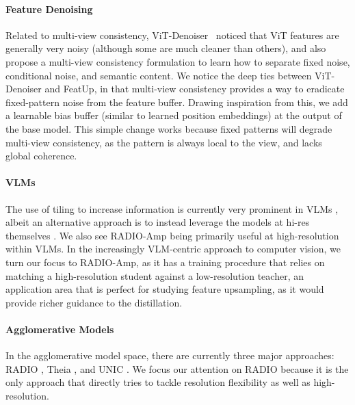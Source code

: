 \paragraph{Feature Denoising}
Related to multi-view consistency, ViT-Denoiser~\cite{yang2024denoising} noticed that ViT features are generally very noisy (although some are much cleaner than others), and also propose a multi-view consistency formulation to learn how to separate fixed noise, conditional noise, and semantic content. We notice the deep ties between ViT-Denoiser and FeatUp, in that multi-view consistency provides a way to eradicate fixed-pattern noise from the feature buffer. Drawing inspiration from this, we add a learnable bias buffer (similar to learned position embeddings) at the output of the base model. This simple change works because fixed patterns will degrade multi-view consistency, as the pattern is always local to the view, and lacks global coherence.

\paragraph{VLMs}
The use of tiling to increase information is currently very prominent in VLMs \cite{liu2024llavanext1p6,chen2024internvl1p5,dai2024nvlm}, albeit an alternative approach is to instead leverage the models at hi-res themselves \cite{beyer2024paligemmaversatile3bvlm,wang2024qwen2vlenhancingvisionlanguagemodels}. We also see RADIO-Amp\citep{heinrich2024radioamplifiedimprovedbaselines} being primarily useful at high-resolution within VLMs. In the increasingly VLM-centric approach to computer vision, we turn our focus to RADIO-Amp, as it has a training procedure that relies on matching a high-resolution student against a low-resolution teacher, an application area that is perfect for studying feature upsampling, as it would provide richer guidance to the distillation.

\paragraph{Agglomerative Models}
In the agglomerative model space, there are currently three major approaches: RADIO \citep{ranzinger2023amradio,ranzinger2024phisdistributionbalancinglabelfree,heinrich2024radioamplifiedimprovedbaselines}, Theia \citep{shang2024theia}, and UNIC \citep{sariyildiz2024unic}. We focus our attention on RADIO because it is the only approach that directly tries to tackle resolution flexibility as well as high-resolution.
